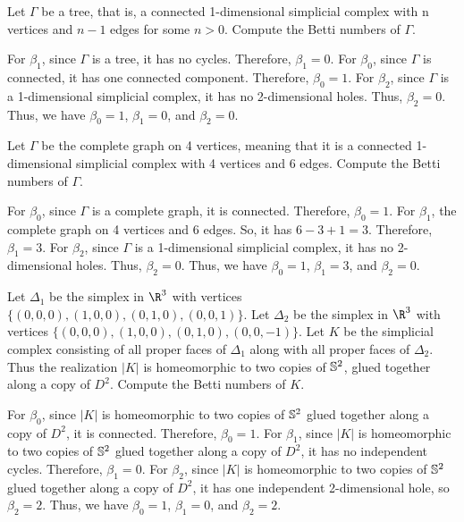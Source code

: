 \begin{problem}[3]
  Let $\Gamma$ be a tree, that is, a connected 1-dimensional simplicial complex with n vertices and $n - 1$ edges for some $n > 0$. Compute the Betti numbers of $\Gamma$.
\end{problem}

\begin{solution}
  For $\beta_1$, since $\Gamma$ is a tree, it has no cycles. Therefore, $\beta_1 = 0$. For $\beta_0$, since $\Gamma$ is connected, it has one connected component. Therefore, $\beta_0 = 1$. For $\beta_2$, since $\Gamma$ is a 1-dimensional simplicial complex, it has no 2-dimensional holes. Thus, $\beta_2 = 0$. Thus, we have $\beta_0 = 1$, $\beta_1 = 0$, and $\beta_2 = 0$.
\end{solution}

\begin{problem}[4]
  Let $\Gamma$ be the complete graph on 4 vertices, meaning that it is a connected 1-dimensional simplicial complex with 4 vertices and 6 edges. Compute the Betti numbers of $\Gamma$.
\end{problem}

\begin{solution}
  For $\beta_0$, since $\Gamma$ is a complete graph, it is connected. Therefore, $\beta_0 = 1$. For $\beta_1$, the complete graph on 4 vertices and 6 edges. So, it has $6 - 3 + 1 = 3$. Therefore, $\beta_1 = 3$. For $\beta_2$, since $\Gamma$ is a 1-dimensional simplicial complex, it has no 2-dimensional holes. Thus, $\beta_2 = 0$. Thus, we have $\beta_0 = 1$, $\beta_1 = 3$, and $\beta_2 = 0$.
\end{solution}

\begin{problem}[5]
  Let $\Delta_1$ be the simplex in $\R^3$ with vertices $\{(0, 0, 0), (1, 0, 0), (0, 1, 0), (0, 0, 1)\}$. Let $\Delta_2$ be the simplex in $\R^3$ with vertices $\{(0, 0, 0), (1, 0, 0), (0, 1, 0), (0, 0, -1)\}$. Let $K$ be the simplicial complex consisting of all proper faces of $\Delta_1$ along with all proper faces of $\Delta_2$. Thus the realization $|K|$ is homeomorphic to two copies of $\S^2$, glued together along a copy of $D^2$. Compute the Betti numbers of $K$.
\end{problem}

\begin{solution}
  For $\beta_0$, since $|K|$ is homeomorphic to two copies of $\S^2$ glued together along a copy of $D^2$, it is connected. Therefore, $\beta_0 = 1$. For $\beta_1$, since $|K|$ is homeomorphic to two copies of $\S^2$ glued together along a copy of $D^2$, it has no independent cycles. Therefore, $\beta_1 = 0$. For $\beta_2$, since $|K|$ is homeomorphic to two copies of $\S^2$ glued together along a copy of $D^2$, it has one independent 2-dimensional hole, so $\beta_2 = 2$. Thus, we have $\beta_0 = 1$, $\beta_1 = 0$, and $\beta_2 = 2$.
\end{solution}

